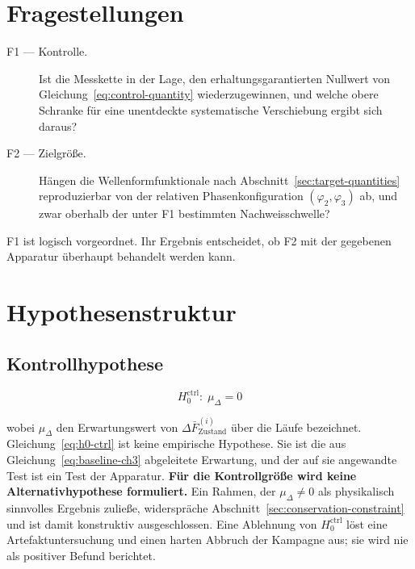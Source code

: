 \documentclass[12pt,a4paper]{report}
\begin{document}
\section{Fragestellungen}

\begin{description}
  \item[F1 --- Kontrolle.] Ist die Messkette in der Lage, den
        erhaltungsgarantierten Nullwert von
        Gleichung~\eqref{eq:control-quantity} wiederzugewinnen, und
        welche obere Schranke für eine unentdeckte systematische
        Verschiebung ergibt sich daraus?
  \item[F2 --- Zielgröße.] Hängen die Wellenformfunktionale nach
        Abschnitt~\ref{sec:target-quantities} reproduzierbar von der
        relativen Phasenkonfiguration $(\varphi_2, \varphi_3)$ ab, und
        zwar oberhalb der unter F1 bestimmten Nachweisschwelle?
\end{description}

F1 ist logisch vorgeordnet. Ihr Ergebnis entscheidet, ob F2 mit der
gegebenen Apparatur überhaupt behandelt werden kann.

\section{Hypothesenstruktur}

\subsection*{Kontrollhypothese}

\begin{equation}
  H_{0}^{\mathrm{ctrl}} : \; \mu_{\Delta} = 0
  \label{eq:h0-ctrl}
\end{equation}

wobei $\mu_{\Delta}$ den Erwartungswert von
$\Delta \bar{F}^{(i)}_{\mathrm{Zustand}}$ über die Läufe bezeichnet.
Gleichung~\eqref{eq:h0-ctrl} ist keine empirische Hypothese. Sie ist die
aus Gleichung~\eqref{eq:baseline-ch3} abgeleitete Erwartung, und der auf
sie angewandte Test ist ein Test der Apparatur. \textbf{Für die
Kontrollgröße wird keine Alternativhypothese formuliert.} Ein Rahmen, der
$\mu_{\Delta} \neq 0$ als physikalisch sinnvolles Ergebnis zuließe,
widerspräche Abschnitt~\ref{sec:conservation-constraint} und ist damit
konstruktiv ausgeschlossen. Eine Ablehnung von
$H_{0}^{\mathrm{ctrl}}$ löst eine Artefaktuntersuchung und einen harten
Abbruch der Kampagne aus; sie wird nie als positiver Befund berichtet.
\end{document}
